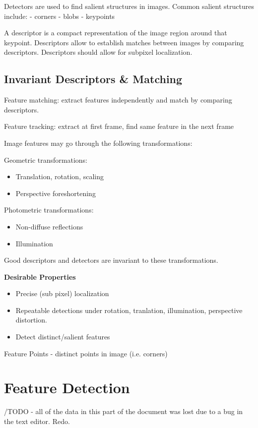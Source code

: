 Detectors are used to find salient structures in images. Common salient structures include:
- corners
- blobs
- keypoints

A descriptor is a compact representation of the image region around that keypoint.
Descriptors allow to establish matches between images by comparing descriptors.
Descriptors should allow for subpixel localization.

\subsection{ Invariant Descriptors \& Matching}

Feature matching: extract features independently and match by comparing descriptors.

Feature tracking: extract at first frame, find same feature in the next frame

Image features may go through the following transformations:

Geometric transformations:
\begin{itemize}
\item Translation, rotation, scaling
\item Perspective foreshortening 
\end{itemize}

Photometric transformations:
\begin{itemize}
\item Non-diffuse reflections 
\item Illumination
\end{itemize}

Good descriptors and detectors are invariant to these transformations. 

\textbf{Desirable Properties}
\begin{itemize} 
\item Precise (sub pixel) localization
\item Repeatable detections under rotation, tranlation, illumination, perspective distortion.
\item Detect distinct/salient features
\end{itemize}

Feature Points - distinct points in image (i.e. corners)

\section{Feature Detection}

/TODO - all of the data in this part of the document was lost due to a bug in the text editor. Redo.

